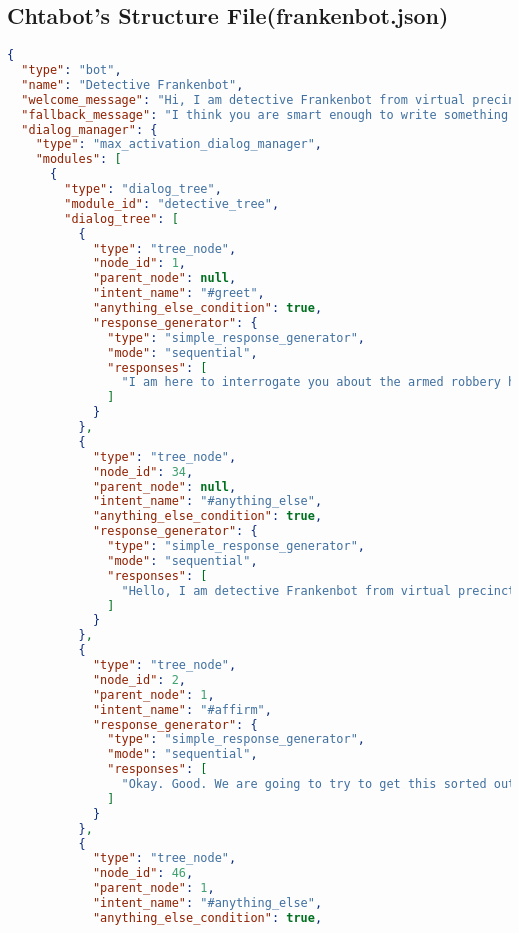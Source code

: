 \begin{appendix}
\section{Chtabot's Structure File(frankenbot.json)\label{appen:frankJson}}
\begin{lstlisting}[language=json, firstnumber=1]
{
  "type": "bot",
  "name": "Detective Frankenbot",
  "welcome_message": "Hi, I am detective Frankenbot from virtual precinct 99.",
  "fallback_message": "I think you are smart enough to write something that makes more sense.",
  "dialog_manager": {
    "type": "max_activation_dialog_manager",
    "modules": [
      {
        "type": "dialog_tree",
        "module_id": "detective_tree",
        "dialog_tree": [
          {
            "type": "tree_node",
            "node_id": 1,
            "parent_node": null,
            "intent_name": "#greet",
            "anything_else_condition": true,
            "response_generator": {
              "type": "simple_response_generator",
              "mode": "sequential",
              "responses": [
                "I am here to interrogate you about the armed robbery happened few days back at a spatkauf near Berliner Strasse. I am looking into that robbery, as you know, so I am going to ask you some questions. You should answer honestly in order to help me in making some decision. All right?"
              ]
            }
          },
          {
            "type": "tree_node",
            "node_id": 34,
            "parent_node": null,
            "intent_name": "#anything_else",
            "anything_else_condition": true,
            "response_generator": {
              "type": "simple_response_generator",
              "mode": "sequential",
              "responses": [
                "Hello, I am detective Frankenbot from virtual precinct 99. You should learn some manners first, to start with greeting when you meet someone."
              ]
            }
          },
          {
            "type": "tree_node",
            "node_id": 2,
            "parent_node": 1,
            "intent_name": "#affirm",
            "response_generator": {
              "type": "simple_response_generator",
              "mode": "sequential",
              "responses": [
                "Okay. Good. We are going to try to get this sorted out as quickly and easily as possible, all right?"
              ]
            }
          },
          {
            "type": "tree_node",
            "node_id": 46,
            "parent_node": 1,
            "intent_name": "#anything_else",
            "anything_else_condition": true,

\end{lstlisting}
\end{appendix}
